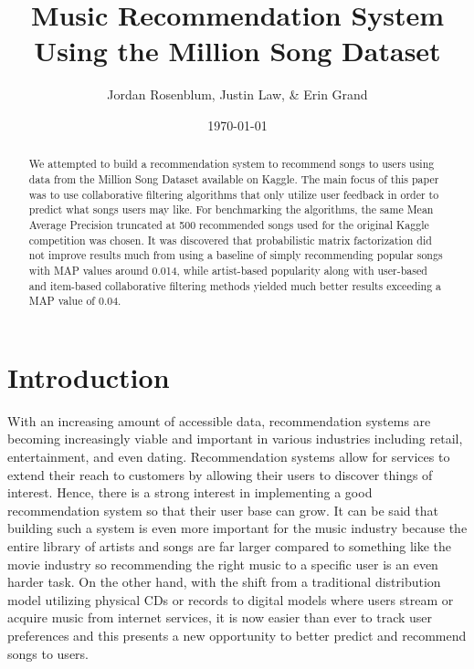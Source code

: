 \documentclass[11pt,preprint]{aastex}
\begin{document}
\title{Music Recommendation System Using the Million Song Dataset}

 \author{Jordan Rosenblum, Justin Law, \& Erin Grand}
 
\date{\today}             

\begin{abstract}
We attempted to build a recommendation system to recommend songs to users using data from the Million Song Dataset available on Kaggle. The main focus of this paper was to use collaborative filtering algorithms that only utilize user feedback in order to predict what songs users may like. For benchmarking the algorithms, the same Mean Average Precision truncated at 500 recommended songs used for the original Kaggle competition was chosen. It was discovered that probabilistic matrix factorization did not improve results much from using a baseline of simply recommending popular songs with MAP values around 0.014, while artist-based popularity along with user-based and item-based collaborative filtering methods yielded much better results exceeding a MAP value of 0.04.

\end{abstract}

\tableofcontents

\section{Introduction}
With an increasing amount of accessible data, recommendation systems are becoming increasingly viable and important in various industries including retail, entertainment, and even dating. Recommendation systems allow for services to extend their reach to customers by allowing their users to discover things of interest. Hence, there is a strong interest in implementing a good recommendation system so that their user base can grow. It can be said that building such a system is even more important for the music industry because the entire library of artists and songs are far larger compared to something like the movie industry so recommending the right music to a specific user is an even harder task. On the other hand, with the shift from a traditional distribution model utilizing physical CDs or records to digital models where users stream or acquire music from internet services, it is now easier than ever to track user preferences and this presents a new opportunity to better predict and recommend songs to users.
\end{document}
